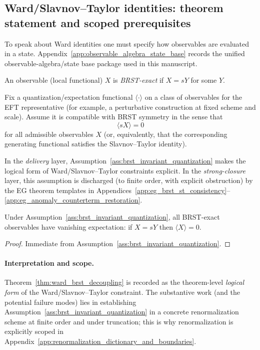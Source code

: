 \subsection{Ward/Slavnov--Taylor identities: theorem statement and scoped prerequisites}

To speak about Ward identities one must specify how observables are evaluated in a state.
Appendix~\ref{app:observable_algebra_state_base} records the unified observable-algebra/state base package used in this manuscript.

\begin{definition}\label{def:brst_exact_observable}
\MathTag An observable (local functional) $X$ is \emph{BRST-exact} if $X=sY$ for some $Y$.
\end{definition}

\begin{assumption}\label{ass:brst_invariant_quantization}
\AuditTag Fix a quantization/expectation functional $\langle\cdot\rangle$ on a class of observables for the EFT representative (for example, a perturbative construction at fixed scheme and scale).
Assume it is compatible with BRST symmetry in the sense that
\[
\langle sX\rangle = 0
\]
for all admissible observables $X$ (or, equivalently, that the corresponding generating functional satisfies the Slavnov--Taylor identity).
\end{assumption}

\AuditTag In the \emph{delivery} layer, Assumption~\ref{ass:brst_invariant_quantization} makes the logical form of Ward/Slavnov--Taylor constraints explicit.
In the \emph{strong-closure} layer, this assumption is discharged (to finite order, with explicit obstruction) by the EG theorem templates in Appendices~\ref{app:eg_brst_st_consistency}--\ref{app:eg_anomaly_counterterm_restoration}.

\begin{theorem}\label{thm:ward_brst_decoupling}
\MathTag Under Assumption~\ref{ass:brst_invariant_quantization}, all BRST-exact observables have vanishing expectation:
if $X=sY$ then $\langle X\rangle=0$.
\end{theorem}
\begin{proof}
Immediate from Assumption~\ref{ass:brst_invariant_quantization}.
\end{proof}

\paragraph{Interpretation and scope.}
\AuditTag Theorem~\ref{thm:ward_brst_decoupling} is recorded as the theorem-level \emph{logical form} of the Ward/Slavnov--Taylor constraint.
The substantive work (and the potential failure modes) lies in establishing Assumption~\ref{ass:brst_invariant_quantization} in a concrete renormalization scheme at finite order and under truncation; this is why renormalization is explicitly scoped in Appendix~\ref{app:renormalization_dictionary_and_boundaries}.


